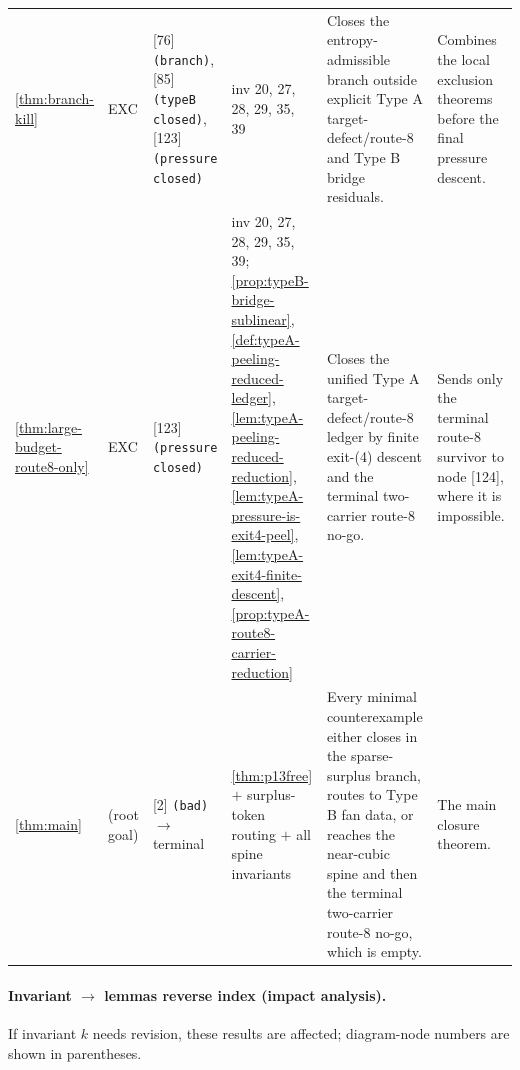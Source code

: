 \documentclass[11pt]{article}
\begin{document}
{\begin{longtable}{L{0.10\textwidth} C{0.045\textwidth} L{0.13\textwidth} L{0.135\textwidth} L{0.28\textwidth} L{0.20\textwidth}}
\cref{thm:branch-kill} & EXC & [76] \texttt{(branch)}, [85] \texttt{(typeB closed)}, [123] \texttt{(pressure closed)} & inv 20, 27, 28, 29, 35, 39 & Closes the entropy-admissible branch outside explicit Type A target-defect/route-8 and Type B bridge residuals. & Combines the local exclusion theorems before the final pressure descent. \\
\cref{thm:large-budget-route8-only} & EXC & [123] \texttt{(pressure closed)} & inv 20, 27, 28, 29, 35, 39; \cref{prop:typeB-bridge-sublinear}, \cref{def:typeA-peeling-reduced-ledger}, \cref{lem:typeA-peeling-reduced-reduction}, \cref{lem:typeA-pressure-is-exit4-peel}, \cref{lem:typeA-exit4-finite-descent}, \cref{prop:typeA-route8-carrier-reduction} & Closes the unified Type A target-defect/route-8 ledger by finite exit-\textup{(4)} descent and the terminal two-carrier route-8 no-go. & Sends only the terminal route-8 survivor to node [124], where it is impossible. \\
\cref{thm:main} & (root goal) & [2] \texttt{(bad)} $\to$ terminal & \cref{thm:p13free} $+$ surplus-token routing $+$ all spine invariants & Every minimal counterexample either closes in the sparse-surplus branch, routes to Type B fan data, or reaches the near-cubic spine and then the terminal two-carrier route-8 no-go, which is empty. & The main closure theorem. \\
\bottomrule
\end{longtable}
}

\paragraph{Invariant $\to$ lemmas reverse index (impact analysis).}
If invariant $k$ needs revision, these results are affected; diagram-node numbers are shown in parentheses.
\end{document}
